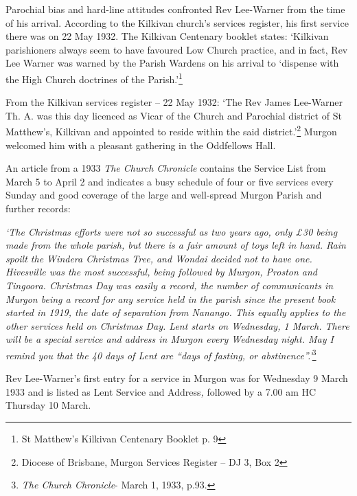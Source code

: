 Parochial bias and hard-line attitudes confronted Rev Lee-Warner from the time of his arrival. According to the Kilkivan church's services register, his first service there was on 22 May 1932. The Kilkivan Centenary booklet states: `Kilkivan parishioners always seem to have favoured Low Church practice, and in fact, Rev Lee Warner was warned by the Parish Wardens on his arrival to `dispense with the High Church doctrines of the Parish.'\footnote{St Matthew's Kilkivan Centenary Booklet p. 9}

From the Kilkivan services register -- 22 May 1932: `The Rev James Lee-Warner Th. A. was this day licenced as Vicar of the Church and Parochial district of St Matthew's, Kilkivan and appointed to reside within the said district.'\footnote{Diocese of Brisbane, Murgon Services Register -- DJ 3, Box 2} Murgon welcomed him with a pleasant gathering in the Oddfellows Hall.

An article from a 1933 \emph{The Church Chronicle} contains the Service List from March 5 to April 2 and indicates a busy schedule of four or five services every Sunday and good coverage of the large and well-spread Murgon Parish and further records:

\emph{`The Christmas efforts were not so successful as two years ago, only £30 being made from the whole parish, but there is a fair amount of toys left in hand. Rain spoilt the Windera Christmas Tree, and Wondai decided not to have one. Hivesville was the most successful, being followed by Murgon, Proston and Tingoora. Christmas Day was easily a record, the number of communicants in Murgon being a record for any service held in the parish since the present book started in 1919, the date of separation from Nanango. This equally applies to the other services held on Christmas Day. Lent starts on Wednesday, 1 March. There will be a special service and address in Murgon every Wednesday night. May I remind you that the 40 days of Lent are ``days of fasting, or abstinence''.'}\footnote{\emph{The Church Chronicle}- March 1, 1933, p.93.}

Rev Lee-Warner's first entry for a service in Murgon was for Wednesday 9 March 1933 and is listed as Lent Service and Address\emph{,} followed by a 7.00 am HC Thursday 10 March.

